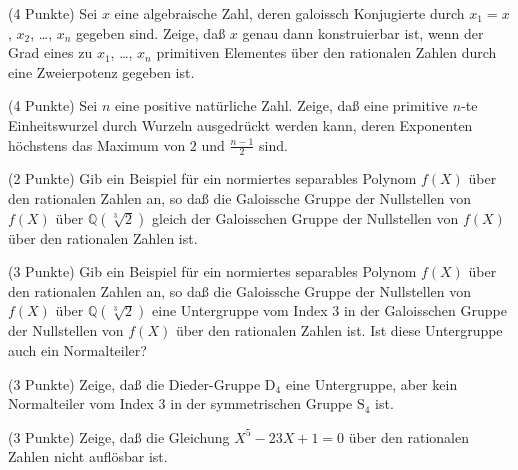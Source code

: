 \documentclass{algsheet}
\begin{document}
\begin{exercise}(4 Punkte)\newline 
    Sei \(x\) eine algebraische Zahl, deren galoissch Konjugierte
    durch \(x_1 = x\), \(x_2\), \dots, \(x_n\) gegeben sind. Zeige, daß
    \(x\) genau dann konstruierbar ist, wenn der Grad eines zu
    \(x_1\), \dots, \(x_n\) primitiven Elementes über den rationalen Zahlen
    durch eine Zweierpotenz gegeben ist.
\end{exercise}

\begin{exercise}(4 Punkte)\newline 
    Sei \(n\) eine positive natürliche Zahl. Zeige, daß eine primitive \(n\)-te Einheitswurzel
    durch Wurzeln ausgedrückt werden kann, deren Exponenten höchstens das Maximum von \(2\) und
    \(\frac{n - 1}2\) sind.
\end{exercise}


\begin{exercise}(2 Punkte)\newline
    Gib ein Beispiel für ein normiertes separables Polynom \(f(X)\) über den
    rationalen Zahlen an, so daß die Galoissche Gruppe der Nullstellen von \(f(X)\)
    über \(\mathbb Q(\sqrt[3]{2})\) gleich der Galoisschen Gruppe der Nullstellen
    von \(f(X)\) über den rationalen Zahlen ist.
\end{exercise}

\begin{exercise}(3 Punkte)\newline
    Gib ein Beispiel für ein normiertes separables Polynom \(f(X)\) über den
    rationalen Zahlen an, so daß die Galoissche Gruppe der Nullstellen von \(f(X)\)
    über \(\mathbb Q(\sqrt[3]{2})\) eine Untergruppe vom Index \(3\)
    in der Galoisschen Gruppe der Nullstellen von \(f(X)\) über den rationalen Zahlen ist. Ist diese 
    Untergruppe auch ein Normalteiler?
\end{exercise}


\begin{exercise}(3 Punkte)\newline
    Zeige, daß die Dieder-Gruppe \(\mathrm D_4\) eine Untergruppe, aber kein Normalteiler vom Index \(3\)
    in der symmetrischen Gruppe \(\mathrm S_4\) ist.
\end{exercise}



\begin{exercise}(3 Punkte)\newline
    Zeige, daß die Gleichung \(X^5 - 23X + 1 = 0\) über den rationalen Zahlen
    nicht auflösbar ist.
\end{exercise}
\end{document}
